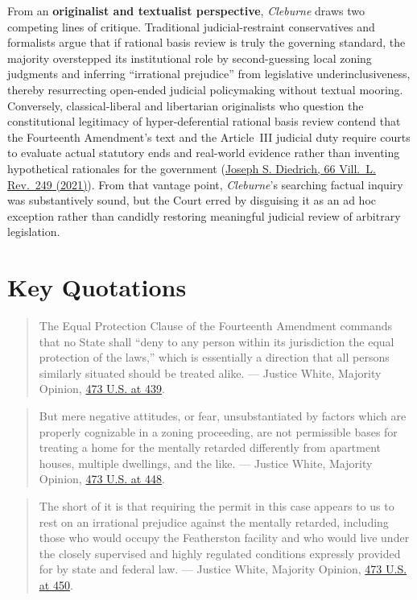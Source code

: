 \documentclass[12pt]{article}
\begin{document}
From an \textbf{originalist and textualist perspective}, \textit{Cleburne} draws two competing lines of critique. Traditional judicial-restraint conservatives and formalists argue that if rational basis review is truly the governing standard, the majority overstepped its institutional role by second-guessing local zoning judgments and inferring ``irrational prejudice'' from legislative underinclusiveness, thereby resurrecting open-ended judicial policymaking without textual mooring. Conversely, classical-liberal and libertarian originalists who question the constitutional legitimacy of hyper-deferential rational basis review contend that the Fourteenth Amendment's text and the Article~III judicial duty require courts to evaluate actual statutory ends and real-world evidence rather than inventing hypothetical rationales for the government (\href{https://digitalcommons.law.villanova.edu/cgi/viewcontent.cgi?article=3486&context=vlr}{Joseph S. Diedrich, 66 Vill.\ L. Rev.\ 249 (2021)}). From that vantage point, \textit{Cleburne}'s searching factual inquiry was substantively sound, but the Court erred by disguising it as an ad hoc exception rather than candidly restoring meaningful judicial review of arbitrary legislation.

\section{Key Quotations}

\begin{quote}
The Equal Protection Clause of the Fourteenth Amendment commands that no State shall ``deny to any person within its jurisdiction the equal protection of the laws,'' which is essentially a direction that all persons similarly situated should be treated alike.
--- Justice White, Majority Opinion, \href{https://supreme.justia.com/cases/federal/us/473/432/}{473 U.S. at 439}.
\end{quote}

\begin{quote}
But mere negative attitudes, or fear, unsubstantiated by factors which are properly cognizable in a zoning proceeding, are not permissible bases for treating a home for the mentally retarded differently from apartment houses, multiple dwellings, and the like.
--- Justice White, Majority Opinion, \href{https://supreme.justia.com/cases/federal/us/473/432/}{473 U.S. at 448}.
\end{quote}

\begin{quote}
The short of it is that requiring the permit in this case appears to us to rest on an irrational prejudice against the mentally retarded, including those who would occupy the Featherston facility and who would live under the closely supervised and highly regulated conditions expressly provided for by state and federal law.
--- Justice White, Majority Opinion, \href{https://supreme.justia.com/cases/federal/us/473/432/}{473 U.S. at 450}.
\end{quote}
\end{document}
